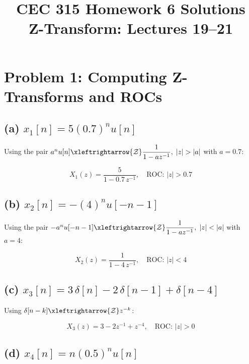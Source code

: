 \documentclass[11pt]{article}
\title{\textbf{CEC 315 Homework 6 Solutions} \\ \large Z-Transform: Lectures 19--21}
\author{}
\date{}
\newcommand{\zt}{\xleftrightarrow{\mathcal{Z}}}
\begin{document}
\maketitle
\thispagestyle{fancy}

\section*{Problem 1: Computing Z-Transforms and ROCs}

\subsection*{(a) $x_1[n] = 5(0.7)^n u[n]$}

Using the pair $a^n u[n] \zt \dfrac{1}{1 - az^{-1}},\; |z|>|a|$ with $a=0.7$:

\begin{equation*}
\boxed{X_1(z) = \frac{5}{1 - 0.7\,z^{-1}}, \quad \text{ROC: } |z| > 0.7}
\end{equation*}

\subsection*{(b) $x_2[n] = -(4)^n u[-n-1]$}

Using the pair $-a^n u[-n-1] \zt \dfrac{1}{1 - az^{-1}},\; |z|<|a|$ with $a=4$:

\begin{equation*}
\boxed{X_2(z) = \frac{1}{1 - 4\,z^{-1}}, \quad \text{ROC: } |z| < 4}
\end{equation*}

\subsection*{(c) $x_3[n] = 3\,\delta[n] - 2\,\delta[n-1] + \delta[n-4]$}

Using $\delta[n-k] \zt z^{-k}$:

\begin{equation*}
\boxed{X_3(z) = 3 - 2z^{-1} + z^{-4}, \quad \text{ROC: } |z| > 0}
\end{equation*}

\subsection*{(d) $x_4[n] = n(0.5)^n u[n]$}
\end{document}
